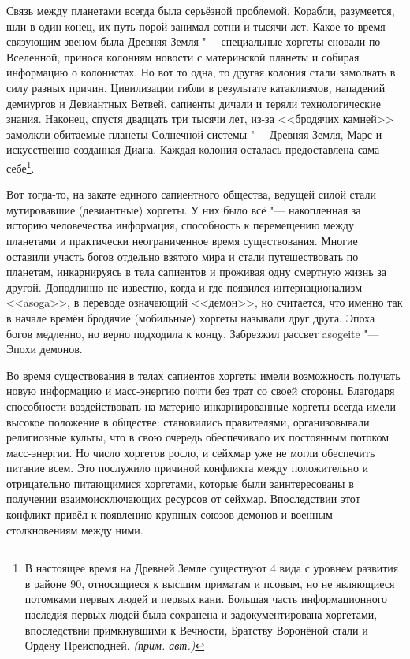 \documentclass[a4paper,10pt,fleqn]{book}
\newcommand{\authornote}{\textit{(прим. авт.)}}
\begin{document}
Связь между планетами всегда была серьёзной проблемой.
Корабли, разумеется, шли в один конец, их путь порой занимал сотни и тысячи лет.
Какое-то время связующим звеном была Древняя Земля "--- специальные хоргеты сновали по Вселенной, принося колониям новости с материнской планеты и собирая информацию о колонистах.
Но вот то одна, то другая колония стали замолкать в силу разных причин.
Цивилизации гибли в результате катаклизмов, нападений демиургов и Девиантных Ветвей, сапиенты дичали и теряли технологические знания.
Наконец, спустя двадцать три тысячи лет, из-за <<бродячих камней>> замолкли обитаемые планеты Солнечной системы "--- Древняя Земля, Марс и искусственно созданная Диана.
Каждая колония осталась предоставлена сама себе\footnote
{В настоящее время на Древней Земле существуют 4 вида с уровнем развития в районе 90, относящиеся к высшим приматам и псовым, но не являющиеся потомками первых людей и первых кани.
Большая часть информационного наследия первых людей была сохранена и задокументирована хоргетами, впоследствии примкнувшими к Вечности, Братству Воронёной стали и Ордену Преисподней. \authornote}.

Вот тогда-то, на закате единого сапиентного общества, ведущей силой стали мутировавшие (девиантные) хоргеты.
У них было всё "--- накопленная за историю человечества информация, способность к перемещению между планетами и практически неограниченное время существования.
Многие оставили участь богов отдельно взятого мира и стали путешествовать по планетам, инкарнируясь в тела сапиентов и проживая одну смертную жизнь за другой.
Доподлинно не известно, когда и где появился интернационализм <<asoga>>, в переводе означающий <<демон>>, но считается, что именно так в начале времён бродячие (мобильные) хоргеты называли друг друга.
Эпоха богов медленно, но верно подходила к концу.
Забрезжил рассвет asogeite "--- Эпохи демонов.

Во время существования в телах сапиентов хоргеты имели возможность получать новую информацию и масс-энергию почти без трат со своей стороны.
Благодаря способности воздействовать на материю инкарнированные хоргеты всегда имели высокое положение в обществе: становились правителями, организовывали религиозные культы, что в свою очередь обеспечивало их постоянным потоком масс-энергии.
Но число хоргетов росло, и сейхмар уже не могли обеспечить питание всем.
Это послужило причиной конфликта между положительно и отрицательно питающимися хоргетами, которые были заинтересованы в получении взаимоисключающих ресурсов от сейхмар.
Впоследствии этот конфликт привёл к появлению крупных союзов демонов и военным столкновениям между ними.
\end{document}

